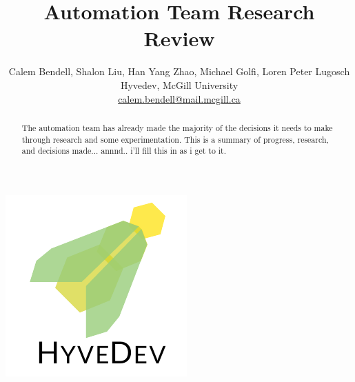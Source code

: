 

\title{Automation Team Research Review}
\author{
\normalsize
{ Calem Bendell, Shalon Liu, Han Yang Zhao, Michael Golfi, Loren Peter Lugosch} \\
Hyvedev, McGill University \\
\href{mailto:calem.bendell@mail.mcgill.ca}{calem.bendell@mail.mcgill.ca}
}
\date{}


\maketitle

\begin{abstract}
The automation team has already made the majority of the decisions it needs to make through research and some experimentation.
This is a summary of progress, research, and decisions made...
annnd.. i'll fill this in as i get to it.
\end{abstract}

\begin{center}
	\includegraphics[width=.3\textwidth]{gfx/hyvedev-logo.pdf}
\end{center}

